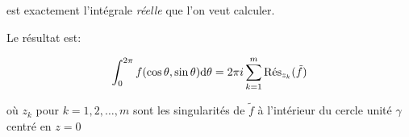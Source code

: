 \begin{enumerate}[label=\alph*)]
\begin{itemize}
    est exactement l'intégrale \textit{réelle} que l'on veut calculer.
    \end{itemize}

    Le résultat est:
    
    \[ \int_0^{2\pi} f(\cos \theta, \sin \theta) \dth = 2\pi i \sum_{k = 1}^m \Res_{z_k}(\tilde{f}) \]
    
    où $z_k$ pour $k = 1, 2, \ldots, m$ sont les singularités de $\tilde{f}$ à l'intérieur du cercle unité $\gamma$ centré en $z = 0$
    
\end{enumerate}
























